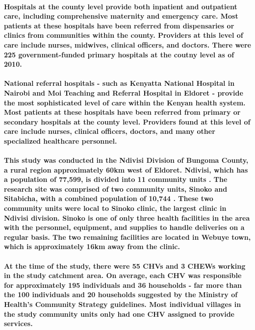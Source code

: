 \paragraph{Hospitals at the county level provide both inpatient and outpatient care, including comprehensive maternity and emergency care. Most patients at these hospitals have been referred from dispensaries or clinics from communities within the county. Providers at this level of care include nurses, midwives, clinical officers, and doctors. There were 225 government-funded primary hospitals at the coutny level as of 2010. \citep{SPA2010}}

\paragraph{National referral hospitals - such as Kenyatta National Hospital in Nairobi and Moi Teaching and Referral Hospital in Eldoret -  provide the most sophisticated level of care within the Kenyan health system. Most patients at these hospitals have been referred from primary or secondary hospitals at the county level. Providers found at this level of care include nurses, clinical officers, doctors, and many other specialized healthcare personnel. \citep{SPA2010}}

\paragraph{This study was conducted in the Ndivisi Division of Bungoma County, a rural region approximately 60km west of Eldoret. 
Ndivisi, which has a population of 77,599, is divided into 11 community units \citep{Census2009}. The research site was comprised of two community units, Sinoko and Sitabicha, with a combined population of 10,744 \citep{Census2009}. These two community units were local to Sinoko clinic, the largest clinic in Ndivisi division. Sinoko is one of only three health facilities in the area with the personnel, equipment, and supplies to handle deliveries on a regular basis. The two remaining facilities are located in Webuye town, which is approximately 16km away from the clinic.}

\paragraph{At the time of the study, there were 55 CHVs and 3 CHEWs working in the study catchment area. On average, each CHV was responsible for approximately 195 individuals and 36 households - far more than the 100 individuals and 20 households suggested by the Ministry of Health's Community Strategy guidelines. Most individual villages in the study community units only had one CHV assigned to provide services.}



